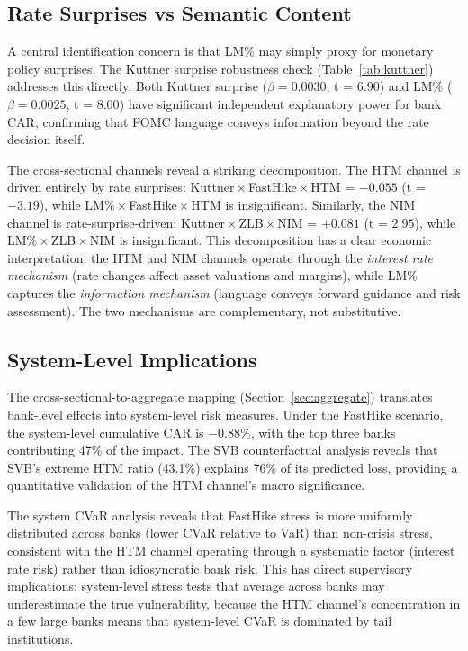 \documentclass[12pt,a4paper]{article}
\begin{document}
\subsection{Rate Surprises vs Semantic Content}

A central identification concern is that LM\% may simply proxy for monetary policy surprises. The Kuttner surprise robustness check (Table~\ref{tab:kuttner}) addresses this directly. Both Kuttner surprise ($\beta = 0.0030$, t = $6.90$) and LM\% ($\beta = 0.0025$, t = $8.00$) have significant independent explanatory power for bank CAR, confirming that FOMC language conveys information beyond the rate decision itself.

The cross-sectional channels reveal a striking decomposition. The HTM channel is driven entirely by rate surprises: Kuttner\,$\times$\,FastHike\,$\times$\,HTM = $-0.055$ (t = $-3.19$), while LM\%\,$\times$\,FastHike\,$\times$\,HTM is insignificant. Similarly, the NIM channel is rate-surprise-driven: Kuttner\,$\times$\,ZLB\,$\times$\,NIM = $+0.081$ (t = $2.95$), while LM\%\,$\times$\,ZLB\,$\times$\,NIM is insignificant. This decomposition has a clear economic interpretation: the HTM and NIM channels operate through the \textit{interest rate mechanism} (rate changes affect asset valuations and margins), while LM\% captures the \textit{information mechanism} (language conveys forward guidance and risk assessment). The two mechanisms are complementary, not substitutive.

\subsection{System-Level Implications}

The cross-sectional-to-aggregate mapping (Section~\ref{sec:aggregate}) translates bank-level effects into system-level risk measures. Under the FastHike scenario, the system-level cumulative CAR is $-0.88$\%, with the top three banks contributing 47\% of the impact. The SVB counterfactual analysis reveals that SVB's extreme HTM ratio (43.1\%) explains 76\% of its predicted loss, providing a quantitative validation of the HTM channel's macro significance.

The system CVaR analysis reveals that FastHike stress is more uniformly distributed across banks (lower CVaR relative to VaR) than non-crisis stress, consistent with the HTM channel operating through a systematic factor (interest rate risk) rather than idiosyncratic bank risk. This has direct supervisory implications: system-level stress tests that average across banks may underestimate the true vulnerability, because the HTM channel's concentration in a few large banks means that system-level CVaR is dominated by tail institutions.
\end{document}
